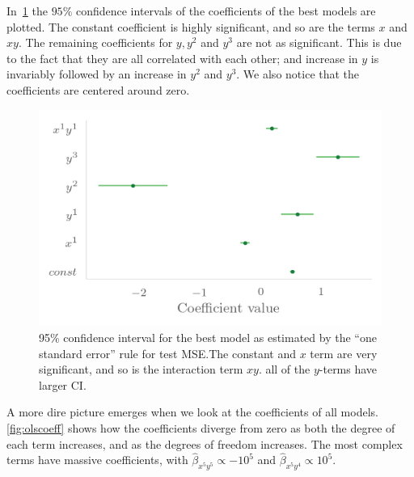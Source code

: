 In~\cref{fig:olsci} the \(95\%\) confidence intervals of the coefficients of the
best models are plotted. The constant coefficient is highly significant, and so
are the terms \(x\) and \(xy\). The remaining coefficients for \(y, y^{2}\) and
\(y^{3}\) are not as significant. This is due to the fact that they are all
correlated with each other; and increase in \(y\) is invariably followed by an
increase in \(y^{2}\) and \(y^{3}\). We also notice that the coefficients are
centered around zero.
\begin{figure}[]
  \centering
  \includegraphics[]{figures/ols_ci.png}
  \caption{\label{fig:olsci} 95\% confidence interval for the best model as
    estimated by the ``one standard error'' rule for test MSE.\@ The constant and
    \(x\) term are very significant, and so is the interaction term \(xy\). all
    of the \(y\)-terms have larger CI.}
\end{figure}

A more dire picture emerges when we look at the coefficients of all models.
\cref{fig:olscoeff} shows how the coefficients diverge from zero as both the
degree of each term increases, and as the degrees of freedom increases. The most
complex terms have massive coefficients, with \(\hat\beta_{x^{5}y^{5}} \propto
-10^{5}\) and \(\hat\beta_{x^{5}y^{4}}\propto 10^{5}\).

